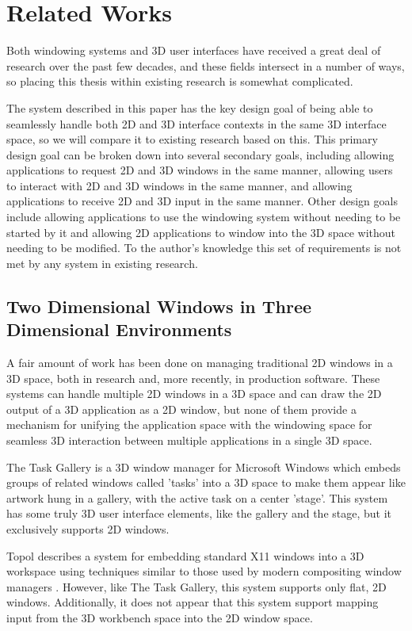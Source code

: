 \chapter{Related Works}
\label{sec:related-works}

Both windowing systems and 3D user interfaces have received a great deal of research over the past few decades, and these fields intersect in a number of ways, so placing this thesis within existing research is somewhat complicated. 

The system described in this paper has the key design goal of being able to seamlessly handle both 2D and 3D interface contexts in the same 3D interface space, so we will compare it to existing research based on this. This primary design goal can be broken down into several secondary goals, including allowing applications to request 2D and 3D windows in the same manner, allowing users to interact with 2D and 3D windows in the same manner, and allowing applications to receive 2D and 3D input in the same manner. Other design goals include allowing applications to use the windowing system without needing to be started by it and allowing 2D applications to window into the 3D space without needing to be modified. To the author's knowledge this set of requirements is not met by any system in existing research.

\section{Two Dimensional Windows in Three Dimensional Environments}
A fair amount of work has been done on managing traditional 2D windows in a 3D space, both in research and, more recently, in production software. These systems can handle multiple 2D windows in a 3D space and can draw the 2D output of a 3D application as a 2D window, but none of them provide a mechanism for unifying the application space with the windowing space for seamless 3D interaction between multiple applications in a single 3D space.

The Task Gallery \cite{task_gallery} is a 3D window manager for Microsoft Windows which embeds groups of related windows called 'tasks' into a 3D space to make them appear like artwork hung in a gallery, with the active task on a center 'stage'. This system has some truly 3D user interface elements, like the gallery and the stage, but it exclusively supports 2D windows. 

Topol describes a system for embedding standard X11 windows into a 3D workspace using techniques similar to those used by modern compositing window managers \cite{xwindow_immersion}. However, like The Task Gallery, this system supports only flat, 2D windows. Additionally, it does not appear that this system support mapping input from the 3D workbench space into the 2D window space.

